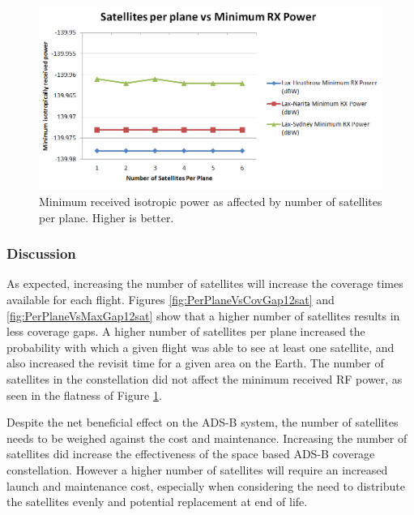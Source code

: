 \begin{figure}[H]
	\centering
	\includegraphics[scale = 0.6]{Pictures/PerPlaneVsRxPower12sat.png}
	
	\caption{Minimum received isotropic power as affected by number of satellites per plane. Higher is better.}
	\label{fig:PerPlaneVsRxPower12sat}
\end{figure}

\subsubsection{Discussion}
As expected, increasing the number of satellites will increase the coverage times available for each flight. Figures \ref{fig:PerPlaneVsCovGap12sat} and \ref{fig:PerPlaneVsMaxGap12sat} show that a higher number of satellites results in less coverage gaps. A higher number of satellites per plane increased the probability with which a given flight was able to see at least one satellite, and also increased the revisit time for a given area on the Earth. The number of satellites in the constellation did not affect the minimum received RF power, as seen in the flatness of Figure \ref{fig:PerPlaneVsRxPower12sat}.

Despite the net beneficial effect on the ADS-B system, the number of satellites needs to be weighed against the cost and maintenance. Increasing the number of satellites did increase the effectiveness of the space based ADS-B coverage constellation. However a higher number of satellites will require an increased launch and maintenance cost, especially when considering the need to distribute the satellites evenly and potential replacement at end of life.


 